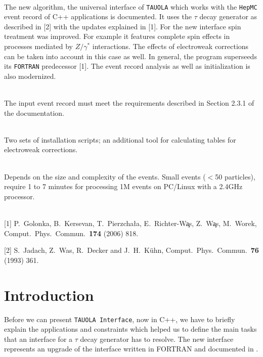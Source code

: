 \documentclass[]{Tauola_interface_design}
\begin{document}
\\
The new algorithm, the universal interface of {\tt TAUOLA} which works with the {\tt HepMC} event record
 of C++ applications is documented. It
uses the $\tau$ decay generator as described in [2]  with the updates explained in [1]. 
For the new interface  spin treatment was improved. For example it features complete spin
effects in processes mediated by $Z/\gamma^*$ interactions. The effects of electroweak corrections 
can be taken into account in this case as well. In general, the program
 superseeds its {\tt FORTRAN} predecessor [1]. The event record analysis as well as initialization is
also modernized.


\\
The input event record must meet the requirements described in Section 2.3.1 of the documentation.


\\
Two sets of installation scripts; an additional tool for calculating tables for electroweak corrections.


\\
Depends on the size and complexity of the events.
Small events ($<$50 particles), require 1 to 7 minutes for processing 1M events on PC/Linux with a 2.4GHz processor.


 \\

[1] P.~Golonka, B.~Kersevan, T.~Pierzcha\l{}a, E.~Richter-W\c as, Z.~W\c as, M.~Worek,   Comput.\ Phys.\ Commun.\  {\bf 174} (2006) 818.

[2] S.~Jadach, Z.~Was, R.~Decker and J.~H.~K\"uhn,  Comput.\ Phys.\ Commun.\  {\bf 76} (1993) 361.

\newpage

\section{Introduction}
Before we can present  {\tt TAUOLA Interface}, now in C++, 
we have to briefly explain
the applications and constraints which helped us
to define the main tasks that an interface 
for a $\tau$ decay generator has to resolve. The new interface represents an upgrade of the interface written in FORTRAN and documented in \cite{Golonka:2003xt}.
\end{document}
